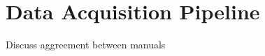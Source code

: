 \section{Data Acquisition Pipeline} \label{sec:meth_DataAcquisitionPipeline}

Discuss aggreement between manuals